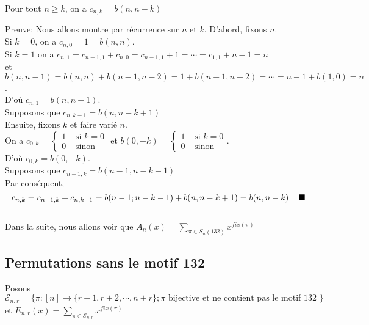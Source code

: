 \begin{proposition}\label{p5}
	Pour tout $n\geq k$, on a $c_{n, k} = b(n, n-k)$
\end{proposition}
Preuve: Nous allons montre par récurrence sur $n$ et $k$.
D'abord, fixons $n$.\\
Si $k=0$, on a $c_{n, 0}=1=b(n,n)$.\\
Si $k=1$ on a $c_{n,1}=c_{n-1, 1} + c_{n,0}=c_{n-1,1}+1 = \cdots = c_{1,1}+n-1=n$\\
et $b(n, n-1)=b(n,n)+ b(n-1,n-2)=1+b(n-1,n-2)=\cdots=n-1 + b(1,0)=n$. \vspace{5pt}\\
D'où $c_{n,1}=b(n, n-1)$.\vspace{10pt}\\
Supposons que $c_{n, k-1} = b(n, n-k+1)$\\
Ensuite, fixons $k$ et faire varié $n$.\\
On a $c_{0,k} = \begin{cases}
		1 & \text{ si } k=0 \\
		0 & \text{ sinon }
	\end{cases}$ et
$b(0, -k)=\begin{cases}
		1 & \text{ si } k=0 \\
		0 & \text{ sinon }
	\end{cases}$.\vspace{5pt}\\
D'où $c_{0, k} = b(0, -k)$.\vspace{10pt}\\
Supposons que $c_{n-1, k} = b(n-1, n-k-1)$\vspace{5pt}\\
Par conséquent,
\[
	c_{n, k} = c_{n-1, k}+ c_{n,k-1} = b(n-1; n-k-1) + b(n, n-k+1) = b(n, n-k) \text{ \hspace{5pt} }\blacksquare\]\vspace{10pt}\\
Dans la suite, nous allons voir que $A_{n}(x) = \underset{\pi \in S_{n}(132)}{\sum} x^{fix(\pi)}$
\subsection{Permutations sans le motif 132}
Posons $\mathcal{E}_{n,r} = \{ \pi:[n] \longrightarrow \{r+1, r+2, \cdots, n+r\}; \pi \text{ bijective et ne contient pas le motif 132 } \}$ et  $E_{n,r}(x) = \underset{\pi \in \mathcal{E}_{n,r}}{\sum}x^{fix(\pi)}$\\


